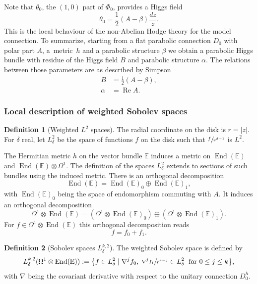 \documentclass[11pt]{article}
\newcommand{\Subsubsection}{\subsubsection}
\theoremstyle{definition}
\newtheorem{definition}{Definition}[section]
\theoremstyle{plain}
\DeclareMathOperator{\End}{End}
\DeclareMathOperator{\Ree}{Re}
\begin{document}
Note that $\theta_0$, the $(1,0)$ part of $\Phi_0$, provides a Higgs field
\[
\theta_0 = \frac{1}{2} \left(A - \beta\right)\frac{d z}{z}.
\]
This is the local behaviour of the non-Abelian Hodge theory for the model connection.
To summarize, starting from a flat parabolic connection $D_0$ with polar part $A$, a~metric~$h$ and a parabolic structure $\beta$ we obtain a parabolic Higgs bundle with residue of the Higgs field $B$ and parabolic structure $\alpha$. The relations between those parameters are as described by Simpson \cite{Simpson}
\begin{equation}\label{eq_nah_parameters}
\begin{split}
B &= \frac{1}{2}(A - \beta),\\
\alpha &= \Ree A.
\end{split}
\end{equation}

\Subsubsection{Local description of weighted Sobolev spaces}\label{subsect_local_weighted}
\begin{definition}[Weighted $L^2$ spaces]
The radial coordinate on the disk is $r=|z|$. For $\delta$ real, let $L^2_{\delta}$ be the space of functions $f$ on the disk such that $\sfrac{f}{r^{\delta+1}}$ is $L^2$.
\end{definition}
The Hermitian metric $h$ on the vector bundle $\mathbb{E}$ induces a metric on $\End (\mathbb E)$ and $\End (\mathbb E)\otimes \Omega^1$. The definition of the spaces $L^2_{\delta}$ extends to sections of such bundles using the induced metric. There is an orthogonal decomposition
\begin{equation}\label{eq_end_E}
\End(\mathbb{E}) = \End(\mathbb{E})_0 \oplus \End(\mathbb{E})_1,
\end{equation}
with $\End(\mathbb{E})_0$ being the space of endomorphism commuting with $A$. It induces an orthogonal decomposition
\[
\Omega^1 \otimes \End(\mathbb{E}) =(\Omega^1 \otimes \End (\mathbb{E})_0) \oplus(\Omega^1 \otimes \End (\mathbb{E})_1).
\]
For $f\in \Omega^1\otimes \End(\mathbb{E}) $ this orthogonal decomposition reads
\[
f=f_0 +f_1.
\]

\begin{definition}[Sobolev spaces $L^{k,2}_{\delta}$]
The weighted Sobolev space is defined by
\[
L^{k,2}_{\delta}(\Omega^1\otimes\End (\mathbb{E})) :=\bigl\lbrace f \in L^2_{\delta} \mid \nabla^j f_0, \; \sfrac{\nabla^j f_1}{r^{k-j}} \in L^{2}_{\delta} \; \text{ for }0\le j \le k\bigr\rbrace,
\]
with $\nabla$ being the covariant derivative with respect to the unitary connection $D_0^h$.
\end{definition}
\end{document}
